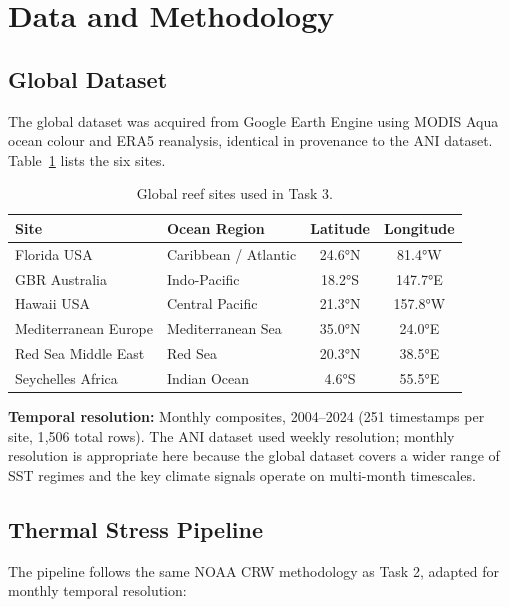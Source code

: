 \documentclass[12pt,a4paper]{report}
\begin{document}
\section{Data and Methodology}

\subsection{Global Dataset}

The global dataset was acquired from Google Earth Engine using MODIS Aqua ocean colour and ERA5 reanalysis, identical in provenance to the ANI dataset.
Table~\ref{tab:global_sites} lists the six sites.

\begin{table}[h]
\centering
\caption{Global reef sites used in Task 3.}
\label{tab:global_sites}
\begin{tabular}{llcc}
\toprule
Site & Ocean Region & Latitude & Longitude \\
\midrule
Florida USA          & Caribbean / Atlantic  & 24.6°N & 81.4°W \\
GBR Australia        & Indo-Pacific          & 18.2°S & 147.7°E \\
Hawaii USA           & Central Pacific       & 21.3°N & 157.8°W \\
Mediterranean Europe & Mediterranean Sea     & 35.0°N & 24.0°E \\
Red Sea Middle East  & Red Sea               & 20.3°N & 38.5°E \\
Seychelles Africa    & Indian Ocean          & 4.6°S  & 55.5°E \\
\bottomrule
\end{tabular}
\end{table}

\noindent
\textbf{Temporal resolution:} Monthly composites, 2004--2024 (251 timestamps per site, 1{,}506 total rows). The ANI dataset used weekly resolution; monthly resolution is appropriate here because the global dataset covers a wider range of SST regimes and the key climate signals operate on multi-month timescales.

\subsection{Thermal Stress Pipeline}

The pipeline follows the same NOAA CRW methodology as Task 2, adapted for monthly temporal resolution:
\end{document}
